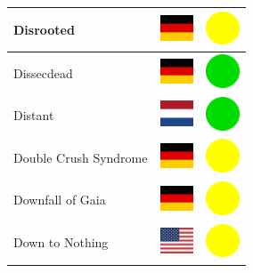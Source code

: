 \documentclass[12pt, a4paper, twoside]{report}
\begin{document}
\begin{center}
\begin{longtable}{|p{5cm}|p{2cm}|p{2cm}|}
 Disrooted                                                  & \includegraphics[width=1cm]{4x3/de} &   \includegraphics[width=1cm]{likes/m} \\ \hline
 Dissecdead                                                 & \includegraphics[width=1cm]{4x3/de} &   \includegraphics[width=1cm]{likes/y} \\ \hline
 Distant                                                    & \includegraphics[width=1cm]{4x3/nl} &   \includegraphics[width=1cm]{likes/y} \\ \hline
 Double Crush Syndrome                                      & \includegraphics[width=1cm]{4x3/de} &   \includegraphics[width=1cm]{likes/m} \\ \hline
 Downfall of Gaia                                           & \includegraphics[width=1cm]{4x3/de} &   \includegraphics[width=1cm]{likes/m} \\ \hline
 Down to Nothing                                            & \includegraphics[width=1cm]{4x3/us} &   \includegraphics[width=1cm]{likes/m} \\ \hline

\end{longtable}
\end{center}
\end{document}
